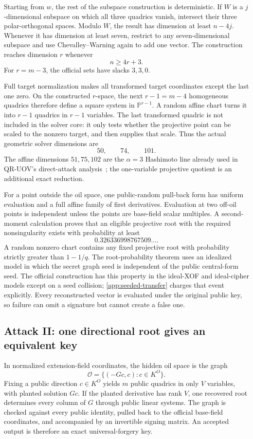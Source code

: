 \documentclass[11pt,a4paper]{article}
\theoremstyle{definition}
\theoremstyle{remark}
\newcommand{\PP}{\mathbb P}
\newcommand{\cO}{\mathcal O}
\begin{document}
Starting from $w$, the rest of the subspace construction is deterministic.  If
$W$ is a $j$-dimensional subspace on which all three quadrics vanish, intersect
their three polar-orthogonal spaces.  Modulo $W$, the result has dimension at
least $n-4j$.  Whenever it has dimension at least seven, restrict to any
seven-dimensional subspace and use Chevalley--Warning again to add one vector.
The construction reaches dimension $r$ whenever
\[
 n\ge4r+3.
\]
For $r=m-3$, the official sets have slacks $3,3,0$.

Full target normalization makes all transformed target coordinates except the
last one zero.  On the constructed $r$-space, the next $r-1=m-4$ homogeneous
quadrics therefore define a square system in $\PP^{r-1}$.  A random affine
chart turns it into $r-1$ quadrics in $r-1$ variables.  The last transformed
quadric is not included in the solver core: it only tests whether the
projective point can be scaled to the nonzero target, and then supplies that
scale.  Thus the actual geometric solver dimensions are
\[
 50,\qquad74,\qquad101.
\]
The affine dimensions $51,75,102$ are the $\alpha=3$ Hashimoto line already
used in QR-UOV's direct-attack analysis~\cite{Hashimoto2023,QRUOVSpec}; the
one-variable projective quotient is an additional exact reduction.

For a point outside the oil space, one public-random pull-back form has uniform
evaluation and a full affine family of first derivatives.  Evaluation at two
off-oil points is independent unless the points are base-field scalar
multiples.  A second-moment calculation proves that an eligible projective
root with the required nonsingularity exists with probability at least
\[
 0.326336998767509\ldots.
\]
A random nonzero chart contains any fixed projective root with probability
strictly greater than $1-1/q$.  The root-probability theorem uses an idealized
model in which the secret graph seed is independent of the public central-form
seed.  The official construction has this property in the ideal-XOF and
ideal-cipher models except on a seed collision; \cref{app:seeded-transfer}
charges that event explicitly.  Every reconstructed vector is evaluated under
the original public key, so failure can omit a signature but cannot create a
false one.

\subsection*{Attack II: one directional root gives an equivalent key}
In normalized extension-field coordinates, the hidden oil space is the graph
\[
 \cO=\{(-Gc,c):c\in K^O\}.
\]
Fixing a public direction $c\in K^O$ yields $m$ public quadrics in only $V$
variables, with planted solution $Gc$.  If the planted derivative has rank
$V$, one recovered root determines every column of $G$ through public linear
systems.  The graph is checked against every public identity, pulled back to
the official base-field coordinates, and accompanied by an invertible signing
matrix.  An accepted output is therefore an exact universal-forgery key.
\end{document}
